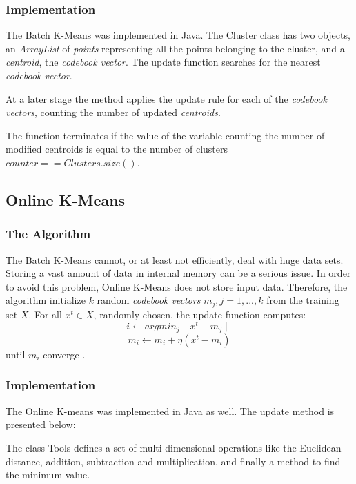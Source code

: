\documentclass{lmproj}
\begin{document}
\subsubsection{Implementation}
The Batch K-Means was implemented in Java. The Cluster class has two objects, an \textit{ArrayList} of \textit{points} representing all the points belonging to the cluster, and a \textit{centroid}, the \textit{codebook vector}.
The update function searches for the nearest \textit{codebook vector}.

At a later stage the method applies the update rule for each of the \textit{codebook vectors}, counting the number of updated \textit{centroids}.

The function terminates if the value of the variable counting the number of modified centroids is equal to the number of clusters $counter == Clusters.size()$.


\subsection{Online K-Means}
\subsubsection{The Algorithm}
The Batch K-Means cannot, or at least not efficiently, deal with huge data sets. Storing a vast amount of data in internal memory can be a serious issue. In order to avoid this problem, Online K-Means does not store input data. Therefore, the algorithm initialize $k$ random \textit{codebook vectors} $m_j,j=1,...,k$ from the training set $X$. For all $x^t \in X$, randomly chosen, the update function computes:  
\begin{equation}
i \longleftarrow arg min_j \parallel x^t - m_j \parallel
\end{equation}
\begin{equation}
m_i \longleftarrow m_i + \eta (x^t - m_i)
\end{equation}
until $m_i$ converge \cite{Clustering}.

\subsubsection{Implementation}
The Online K-means was implemented in Java as well. The update method is presented below:

The class Tools defines a set of multi dimensional operations like the Euclidean distance, addition, subtraction and multiplication, and finally a method to find the minimum value. 

\end{document}
